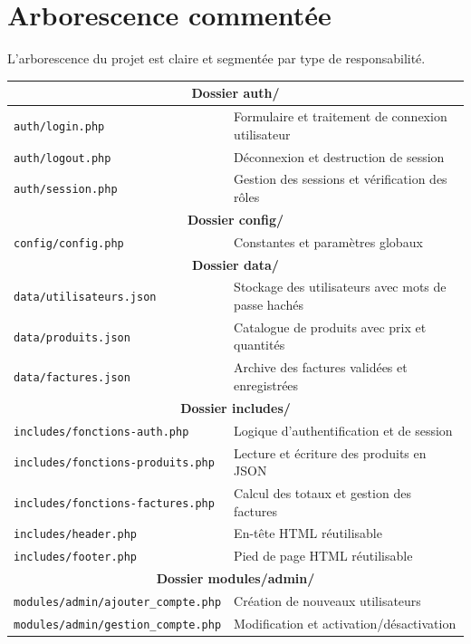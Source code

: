 \documentclass[12pt,a4paper]{article}
\begin{document}
\section{Arborescence commentée}
L'arborescence du projet est claire et segmentée par type de responsabilité.
\begin{table}[h]
\centering
\small
\begin{tabular}{|l|p{8cm}|}
\multicolumn{2}{|c|}{\textbf{Dossier auth/}} \\
\hline
\texttt{auth/login.php} & Formulaire et traitement de connexion utilisateur \\
\hline
\texttt{auth/logout.php} & Déconnexion et destruction de session \\
\hline
\texttt{auth/session.php} & Gestion des sessions et vérification des rôles \\
\hline
\multicolumn{2}{|c|}{\textbf{Dossier config/}} \\
\hline
\texttt{config/config.php} & Constantes et paramètres globaux \\
\hline
\multicolumn{2}{|c|}{\textbf{Dossier data/}} \\
\hline
\texttt{data/utilisateurs.json} & Stockage des utilisateurs avec mots de passe hachés \\
\hline
\texttt{data/produits.json} & Catalogue de produits avec prix et quantités \\
\hline
\texttt{data/factures.json} & Archive des factures validées et enregistrées \\
\hline
\multicolumn{2}{|c|}{\textbf{Dossier includes/}} \\
\hline
\texttt{includes/fonctions-auth.php} & Logique d'authentification et de session \\
\hline
\texttt{includes/fonctions-produits.php} & Lecture et écriture des produits en JSON \\
\hline
\texttt{includes/fonctions-factures.php} & Calcul des totaux et gestion des factures \\
\hline
\texttt{includes/header.php} & En-tête HTML réutilisable \\
\hline
\texttt{includes/footer.php} & Pied de page HTML réutilisable \\
\hline
\multicolumn{2}{|c|}{\textbf{Dossier modules/admin/}} \\
\hline
\texttt{modules/admin/ajouter\_compte.php} & Création de nouveaux utilisateurs \\
\hline
\texttt{modules/admin/gestion\_compte.php} & Modification et activation/désactivation \\

\end{tabular}
\end{table}
\end{document}
